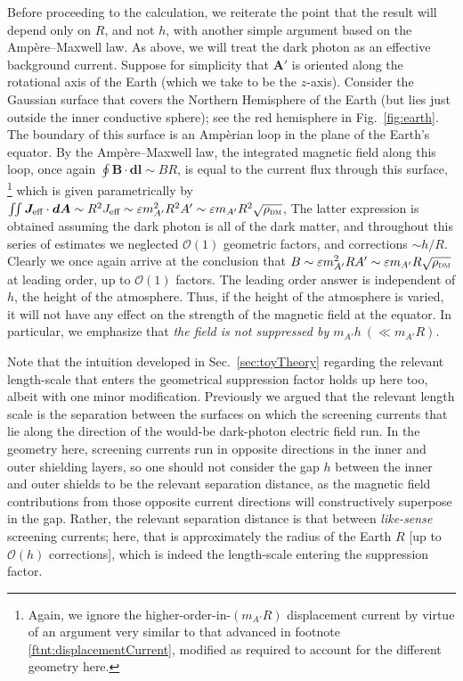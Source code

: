 \documentclass[amsmath,amssymb,aps,10pt,prd,letterpaper,nofootinbib,balancelastpage,notitlepage,superscriptaddress,twocolumn,floatfix]{revtex4-2}
\newcommand{\figref}[2][]{Fig{#1}.~\ref{#2}}		%
\newcommand{\secref}[2][]{Sec{#1}.~\ref{#2}}		%
\begin{document}
Before proceeding to the calculation, we reiterate the point that the result will depend only on $R$, and not $h$, with another simple argument based on the Amp\`ere--Maxwell law.
As above, we will treat the dark photon as an effective background current.
Suppose for simplicity that $\bm{A}'$ is oriented along the rotational axis of the Earth (which we take to be the $z$-axis).
Consider the Gaussian surface that covers the Northern Hemisphere of the Earth (but lies just outside the inner conductive sphere); see the red hemisphere in \figref{fig:earth}.
The boundary of this surface is an Amp\`erian loop in the plane of the Earth's equator.
By the Amp\`ere--Maxwell law, the integrated magnetic field along this loop, once again $\oint \bm{B}\cdot\bm{dl} \sim BR$, is equal to the current flux through this surface,%
\footnote{\label{ftnt:noDisplacement2}%
    Again, we ignore the higher-order-in-$(m_{A'}R)$ displacement current by virtue of an argument very similar to that advanced in footnote \ref{ftnt:displacementCurrent}, modified as required to account for the different geometry here.
} %
which is given parametrically by $\iint \bm{J}_{\text{eff}} \cdot \bm{dA} \sim R^2 J_{\text{eff}} \sim \varepsilon m_{A'}^2R^2 A' \sim  \varepsilon m_{A'} R^2 \sqrt{\rho_{\textsc{dm}}}$,
The latter expression is obtained assuming the dark photon is all of the dark matter, and throughout this series of estimates we neglected $\mathcal{O}(1)$ geometric factors, and corrections $\sim h/R$.
Clearly we once again arrive at the conclusion that $B \sim \varepsilon m_{A'}^2RA' \sim  \varepsilon m_{A'}R \sqrt{\rho_{\textsc{dm}}}$ at leading order, up to $\mathcal{O}(1)$ factors.
The leading order answer is independent of $h$, the height of the atmosphere. 
Thus, if the height of the atmosphere is varied, it will not have any effect on the strength of the magnetic field at the equator.
In particular, we emphasize that \emph{the field is not suppressed by $m_{A'}h\ (\ll m_{A'}R)$.}

Note that the intuition developed in \secref{sec:toyTheory} regarding the relevant length-scale that enters the geometrical suppression factor holds up here too, albeit with one minor modification.
Previously we argued that the relevant length scale is the separation between the surfaces on which the screening currents that lie along the direction of the would-be dark-photon electric field run.
In the geometry here, screening currents run in opposite directions in the inner and outer shielding layers, so one should not consider the gap $h$ between the inner and outer shields to be the relevant separation distance, as the magnetic field contributions from those opposite current directions will constructively superpose in the gap.
Rather, the relevant separation distance is that between \emph{like-sense} screening currents; here, that is approximately the radius of the Earth $R$ [up to $\mathcal{O}(h)$ corrections], which is indeed the length-scale entering the suppression factor.
\end{document}
